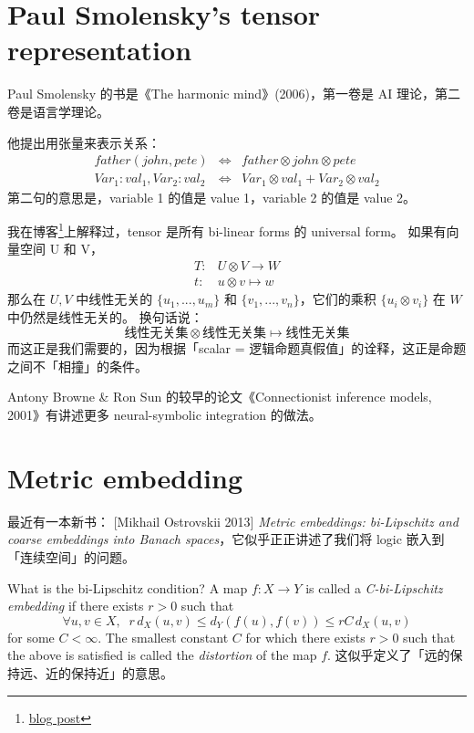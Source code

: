 \documentclass[12pt]{article}
\begin{document}
\section{Paul Smolensky's tensor representation}

Paul Smolensky 的书是《The harmonic mind》(2006)，第一卷是 AI 理论，第二卷是语言学理论。

他提出用张量来表示关系：
\begin{eqnarray}
father(john, pete) & \Leftrightarrow & father \otimes john \otimes pete \nonumber \\
Var_1 : val_1, Var_2 : val_2 & \Leftrightarrow & Var_1 \otimes val_1 + Var_2 \otimes val_2 \nonumber 
\end{eqnarray}
第二句的意思是，variable 1 的值是 value 1，variable 2 的值是 value 2。 

我在博客\footnote{\href{http://geniferology.blogspot.hk/2015/03/what-are-tensors.html}{blog post}}上解释过，tensor 是所有 bi-linear forms 的 universal form。 如果有向量空间 U 和 V，
\begin{eqnarray}
T: & U \otimes V \rightarrow W \nonumber \\
t: & u \otimes v \mapsto w \nonumber 
\end{eqnarray}
那么在 $U, V$ 中线性无关的 $\{u_1, ..., u_m \}$ 和 $\{ v_1, ..., v_n \}$，它们的乘积 $\{ u_i \otimes v_i \}$ 在 $W$ 中仍然是线性无关的。  换句话说：
$$ \mbox{线性无关集} \otimes \mbox{线性无关集} \mapsto \mbox{线性无关集} $$
而这正是我们需要的，因为根据「scalar = 逻辑命题真假值」的诠释，这正是命题之间不「相撞」的条件。

Antony Browne \& Ron Sun 的较早的论文《Connectionist inference models, 2001》有讲述更多 neural-symbolic integration 的做法。

\section{Metric embedding}

最近有一本新书： [Mikhail Ostrovskii 2013] \textit{Metric embeddings: bi-Lipschitz and coarse embeddings into Banach spaces}，它似乎正正讲述了我们将 logic 嵌入到「连续空间」的问题。

What is the bi-Lipschitz condition?  A map $f: X \rightarrow Y$ is called a \textit{C-bi-Lipschitz embedding} if there exists $r > 0$ such that
$$ \forall u,v \in X, \;\; r\, d_X(u,v) \leq d_Y(f(u), f(v)) \leq r C\, d_X(u,v) $$
for some $C < \infty$.  The smallest constant $C$ for which there exists $r > 0$ such that the above is satisfied is called the \textit{distortion} of the map $f$.  这似乎定义了「远的保持远、近的保持近」的意思。
\end{document}
